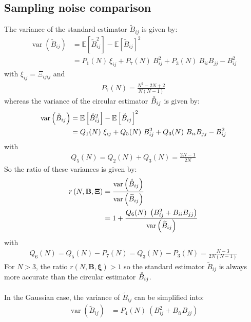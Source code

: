 \documentclass[12pt]{scrartcl}
\DeclareMathOperator{\var}{var}
\begin{document}
\subsection{Sampling noise comparison}
The variance of the standard estimator $\widetilde{B}_{ij}$ is given by:
\begin{align}
\var\left(\widetilde{B}_{ij}\right) & = \mathbb{E} \left[\widetilde{B}_{ij}^2\right]-\mathbb{E} \left[\widetilde{B}_{ij}\right]^2 \nonumber \\
& = P_1(N) \ \xi_{ij} + P_7(N) \ B_{ij}^2 + P_3(N) \ B_{ii} B_{jj} - B_{ij}^2
\end{align}
with $\xi_{ij} = \Xi_{ijij}$ and
\begin{align}
P_7(N) = \frac{N^2-2N+2}{N(N-1)}
\end{align}
whereas the variance of the circular estimator $\accentset{\circ}{B}_{ij}$ is given by:
\begin{align}
\var\left(\accentset{\circ}{B}_{ij}\right) & = \mathbb{E} \left[\accentset{\circ}{B}_{ij}^2\right]-\mathbb{E} \left[\accentset{\circ}{B}_{ij}\right]^2 \nonumber \\
& = Q_1(N) \ \xi_{ij} + Q_5(N) \ B_{ij}^2 + Q_3(N) \ B_{ii} B_{jj} - B_{ij}^2
\end{align}
with
\begin{align}
Q_5(N) = Q_2(N) + Q_3(N) = \frac{2N-1}{2N}
\end{align}
So the ratio of these variances is given by:
\begin{align}
r\left(N, \mathbf{B}, \boldsymbol{\Xi}\right) & = \frac{\var\left(\accentset{\circ}{B}_{ij}\right)}{\var\left(\widetilde{B}_{ij}\right)} \nonumber \\
& = 1+\frac{Q_6(N) \ \left(B_{ij}^2 + B_{ii} B_{jj}\right)}{\var\left(\widetilde{B}_{ij}\right)}
\end{align}
with
\begin{align}
Q_6(N) = Q_5(N)-P_7(N) = Q_3(N) - P_3(N) = \frac{N-3}{2N(N-1)}
\end{align}
For $N > 3$, the ratio $r\left(N, \mathbf{B}, \boldsymbol{\xi}\right) > 1$ so the standard estimator $\widetilde{B}_{ij}$ is always more accurate than the circular estimator $\accentset{\circ}{B}_{ij}$.\\
$  $\\
In the Gaussian case, the variance of $\widetilde{B}_{ij}$ can be simplified into:
\begin{align}
\var\left(\widetilde{B}_{ij}\right) & = P_4(N) \ \left(B_{ij}^2+B_{ii} B_{jj}\right)
\end{align}
\end{document}
